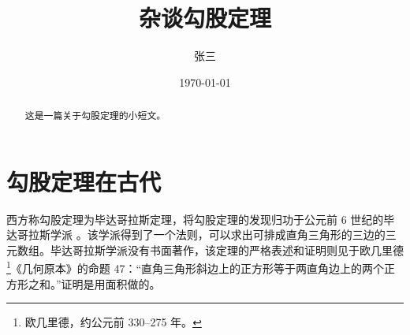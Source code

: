 \documentclass[UTF8]{ctexart}
\title{\heiti 杂谈勾股定理}
\author{\kaishu 张三}
\date{\today}
\begin{document}
\maketitle

\begin{abstract}
这是一篇关于勾股定理的小短文。
\end{abstract}
\tableofcontents
\section{勾股定理在古代}
西方称勾股定理为毕达哥拉斯定理，将勾股定理的发现归功于公元前 6 世纪的毕达哥拉斯学派 \cite{Kline}。该学派得到了一个法则，可以求出可排成直角三角形的三边的三元数组。毕达哥拉斯学派没有书面著作，该定理的严格表述和证明则见于欧几里德\footnote{欧几里德，约公元前 330--275 年。}《几何原本》的命题 47：“直角三角形斜边上的正方形等于两直角边上的两个正方形之和。”证明是用面积做的。
\end{document}
